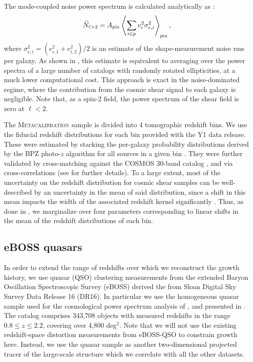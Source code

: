 \documentclass[a4paper,11pt]{article}
\newcommand{\lenangle}[1]{\left\langle #1 \right\rangle}
\newcommand{\Apix}{A_{\rm pix}}
\newcommand{\eboss}{eBOSS-QSO\xspace}
\newcommand{\mcal}{\textsc{Metacalibration}\xspace}
\begin{document}
        The mode-coupled noise power spectrum is calculated analytically as \cite{2010.09717}:
        \begin{equation}
          \widetilde{N}_{\ell > 2} = \Apix \lenangle{\sum_{i\in p} v_i^2 \sigma^2_{e,i}}_{\rm pix},\label{eq:des.sh.noise}
        \end{equation}
        where $\sigma^2_{e,i} = (e_{i,1}^2 + e_{i,2}^2)/2$ is an estimate of the shape-measurement noise rms per galaxy. As shown in \cite{2010.09717}, this estimate is equivalent to averaging over the power spectra of a large number of catalogs with randomly rotated ellipticities, at a much lower computational cost. This approach is exact in the noise-dominated regime, where the contribution from the cosmic shear signal to each galaxy is negligible. Note that, as a spin-2 field, the power spectrum of the shear field is zero at $\ell<2$.

        The \mcal sample is divided into 4 tomographic redshift bins. We use the fiducial redshift distributions for each bin provided with the Y1 data release. These were estimated by stacking the per-galaxy probability distributions derived by the BPZ \cite{astro-ph/0605262} photo-$z$ algorithm for all sources in a given bin \cite{1708.01532}. They were further validated by cross-matching against the COSMOS 30-band catalog \cite{1604.02350}, and via cross-correlations (see \cite{1708.01532} for further details). To a large extent, most of the uncertainty on the redshift distribution for cosmic shear samples can be well-described by an uncertainty in the mean of said distribution, since a shift in this mean impacts the width of the associated redshift kernel significantly \cite{2003.11558}. Thus, as done in \cite{1708.01538}, we marginalize over four parameters corresponding to linear shifts in the mean of the redshift distributions of each bin.

    \subsection{eBOSS quasars}\label{ssec:data.eBOSS}
      In order to extend the range of redshifts over which we reconstruct the growth history, we use quasar (QSO) clustering measurements from the extended Baryon Oscillation Spectroscopic Survey (eBOSS) derived the from Sloan Digital Sky Survey Data Release 16 (DR16). In particular we use the homogeneous quasar sample used for the cosmological power spectrum analysis of \cite{2007.08999,2007.08998}, and presented in \citep{2007.09000}. The catalog comprises 343,708 objects with measured redshifts in the range $0.8 \leq z \leq 2.2$, covering over 4,800 deg$^2$. Note that we will not use the existing redshift-space distortion measurements from \eboss to constrain growth here. Instead, we use the quasar sample as another two-dimensional projected tracer of the large-scale structure which we correlate with all the other datasets.
\end{document}
